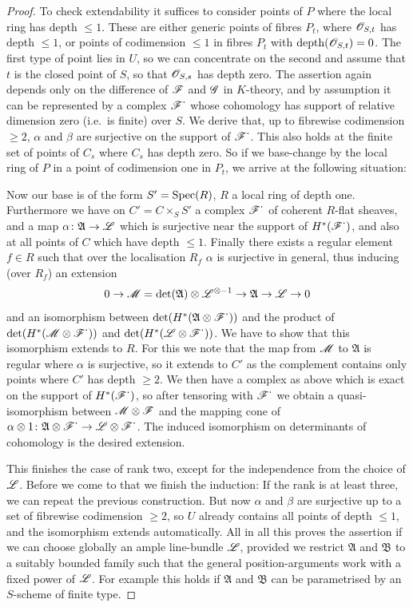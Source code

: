 \documentclass[12pt,english]{smfart}
\newcommand{\Ab}{\mathfrak{A}} \newcommand{\Bb}{\mathfrak{B}} \newcommand{\FA}{\mathfrak{A}} \newcommand{\FB}{\mathfrak{B}} \newcommand{\g}{\mathfrak{g}} \newcommand{\n}{\mathfrak{n}} \newcommand{\h}{\mathfrak{h}} \newcommand{\hh}{\mathfrak{h}} \newcommand{\p}{\mathfrak{p}} \newcommand{\ttt}{\mathfrak{t}} \newcommand{\zz}{\mathfrak{z}} \newcommand{\slt}{\mathfrak{sl}_2} \newcommand{\sltwo}{\mathfrak{sl}_2}
\theoremstyle{plain} \newtheorem{innerthm}{Theorem} \newtheorem{innerlem}{Lemma} \newtheorem{innerprop}{Proposition} \newtheorem{innercor}{Corollary} \theoremstyle{definition} \newtheorem{innerdefn}{Definition} \newtheorem{innerconstr}{Construction} \theoremstyle{remark} \newtheorem*{remark}{Remark} \newtheorem*{remarks}{Remarks} \newtheorem*{applications}{Applications}
\begin{document}
\begin{proof}
To check extendability it suffices to consider points of $P$ where the local ring has depth $\le 1$. These are either generic points of fibres $P_t$, where $\mathscr{O}_{S,t}$ has depth $\le 1$, or points of codimension $\le 1$ in fibres $P_t$ with $\operatorname{depth}(\mathscr{O}_{S,t})=0$. The first type of point lies in $U$, so we can concentrate on the second and assume that $t$ is the closed point of $S$, so that $\mathscr{O}_{S,s}$ has depth zero. The assertion again depends only on the difference of $\mathscr{F}$ and $\mathscr{G}$ in $K$-theory, and by assumption it can be represented by a complex $\mathscr{F}^{\textstyle\cdot}$ whose cohomology has support of relative dimension zero (i.e.\ is finite) over $S$. We derive that, up to fibrewise codimension $\ge 2$, $\alpha$ and $\beta$ are surjective on the support of $\mathscr{F}^{\textstyle\cdot}$. This also holds at the finite set of points of $C_s$ where $C_s$ has depth zero. So if we base-change by the local ring of $P$ in a point of codimension one in $P_t$, we arrive at the following situation:

Now our base is of the form $S'=\operatorname{Spec}(R)$, $R$ a local ring of depth one. Furthermore we have on $C'=C\times_S S'$ a complex $\mathscr{F}^{\textstyle\cdot}$ of coherent $R$-flat sheaves, and a map $\alpha\colon\Ab\to\sL$ which is surjective near the support of $H^*(\mathscr{F}^{\textstyle\cdot})$, and also at all points of $C$ which have depth $\le 1$. Finally there exists a regular element $f\in R$ such that over the localisation $R_f$ $\alpha$ is surjective in general, thus inducing (over $R_f$) an extension
\[
0\to\sM=\det(\Ab)\otimes\sL^{\otimes-1}\to\Ab\to\sL\to 0
\]
and an isomorphism between $\det(H^*(\Ab\otimes\sF^{\textstyle\cdot}))$ and the product of $\det(H^*(\mathscr{M}\otimes\mathscr{F}^{\textstyle\cdot}))$ and $\det(H^*(\mathscr{L}\otimes\mathscr{F}^{\textstyle\cdot}))$. We have to show that this isomorphism extends to $R$. For this we note that the map from $\mathscr{M}$ to $\Ab$ is regular where $\alpha$ is surjective, so it extends to $C'$ as the complement contains only points where $C'$ has depth $\ge 2$. We then have a complex as above which is exact on the support of $H^*(\mathscr{F}^{\textstyle\cdot})$, so after tensoring with $\mathscr{F}^{\textstyle\cdot}$ we obtain a quasi-isomorphism between $\mathscr{M}\otimes\mathscr{F}$ and the mapping cone of $\alpha\otimes 1\colon\Ab\otimes\sF^{\textstyle\cdot}\to \sL\otimes\sF^{\textstyle\cdot}$. The induced isomorphism on determinants of cohomology is the desired extension.

This finishes the case of rank two, except for the independence from the choice of $\mathscr{L}$. Before we come to that we finish the induction: If the rank is at least three, we can repeat the previous construction. But
now $\alpha$ and $\beta$ are surjective up to a set of fibrewise codimension $\ge 2$, so $U$ already contains all points of depth $\le 1$, and the isomorphism extends automatically. All in all this proves the assertion if we can choose globally an ample line-bundle $\mathscr{L}$, provided we restrict $\Ab$ and $\Bb$ to a suitably bounded family such that the general position-arguments work with a fixed power of $\mathscr{L}$. For example this holds if $\Ab$ and $\Bb$ can be parametrised by an $S$-scheme of finite type.


\end{proof}
\end{document}
